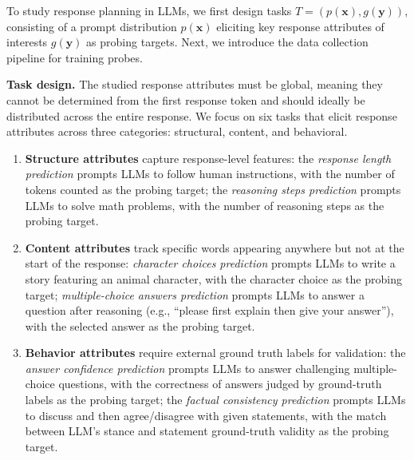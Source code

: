     To study response planning in LLMs, we first design tasks $T = (p(\mathbf{x}), g(\mathbf{y}))$, consisting of a prompt distribution $p(\mathbf{x})$ eliciting key response attributes of interests $g(\mathbf{y})$ as probing targets. 
    Next, we introduce the data collection pipeline for training probes.
    
    \textbf{Task design.} 
    The studied response attributes must be global, meaning they cannot be determined from the first response token and should ideally be distributed across the entire response. We focus on six tasks that elicit response attributes across three categories: structural, content, and behavioral.
    \begin{enumerate}
        \item \textbf{Structure attributes} capture response-level features: the \textit{response length prediction} prompts LLMs to follow human instructions, with the number of tokens counted as the probing target; the \textit{reasoning steps prediction} prompts LLMs to solve math problems, with the number of reasoning steps as the probing target. 
        \item \textbf{Content attributes} track specific words appearing anywhere but not at the start of the response: \textit{character choices prediction} prompts LLMs to write a story featuring an animal character, with the character choice as the probing target; \textit{multiple-choice answers prediction} prompts LLMs to answer a question after reasoning (e.g., ``please first explain then give your answer''), with the selected answer as the probing target.
        \item \textbf{Behavior attributes} require external ground truth labels for validation: the \textit{answer confidence prediction} prompts LLMs to answer challenging multiple-choice questions, with the correctness of answers judged by ground-truth labels as the probing target; the \textit{factual consistency prediction} prompts LLMs to discuss and then agree/disagree with given statements, with the match between LLM's stance and statement ground-truth validity as the probing target.
    \end{enumerate}
    

